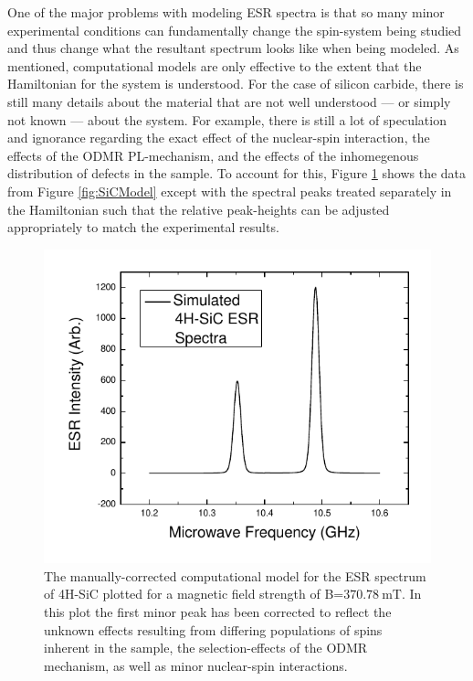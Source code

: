 \documentclass[oneside, noacknowlegments]{BYUPhys}
\begin{document}
One of the major problems with modeling ESR spectra is that so many minor experimental conditions can fundamentally change the spin-system being studied and thus change what the resultant spectrum looks like when being modeled. As mentioned, computational models are only effective to the extent that the Hamiltonian for the system is understood. For the case of silicon carbide, there is still many details about the material that are not well understood --- or simply not known --- about the system. For example, there is still a lot of speculation and ignorance regarding the exact effect of the nuclear-spin interaction, the effects of the ODMR PL-mechanism, and the effects of the inhomegenous distribution of defects in the sample. To account for this, Figure \ref{fig:SiCModelCorrected} shows the data from Figure \ref{fig:SiCModel} except with the spectral peaks treated separately in the Hamiltonian such that the relative peak-heights can be adjusted appropriately to match the experimental results.

\begin{figure}
    \centerline{\includegraphics{p14-esr}}
    \caption[ESR Computational Model for SiC]{\label{fig:SiCModelCorrected}
     The manually-corrected computational model for the ESR spectrum of 4H-SiC plotted for a magnetic field strength of B=$370.78~\text{mT}$. In this plot the first minor peak has been corrected to reflect the unknown effects resulting from differing populations of spins inherent in the sample, the selection-effects of the ODMR mechanism, as well as minor nuclear-spin interactions.}
 \end{figure}
\end{document}
